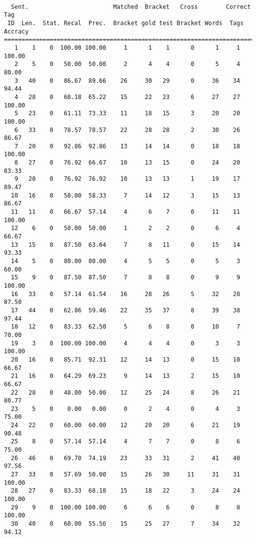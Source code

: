 \begin{verbatim}

  Sent.                        Matched  Bracket   Cross        Correct Tag
 ID  Len.  Stat. Recal  Prec.  Bracket gold test Bracket Words  Tags Accracy
============================================================================
   1    1    0  100.00 100.00     1      1    1      0      1     1   100.00
   2    5    0   50.00  50.00     2      4    4      0      5     4    80.00
   3   40    0   86.67  89.66    26     30   29      0     36    34    94.44
   4   28    0   68.18  65.22    15     22   23      6     27    27   100.00
   5   23    0   61.11  73.33    11     18   15      3     20    20   100.00
   6   33    0   78.57  78.57    22     28   28      2     30    26    86.67
   7   20    0   92.86  92.86    13     14   14      0     18    18   100.00
   8   27    0   76.92  66.67    10     13   15      0     24    20    83.33
   9   20    0   76.92  76.92    10     13   13      1     19    17    89.47
  10   16    0   50.00  58.33     7     14   12      3     15    13    86.67
  11   11    0   66.67  57.14     4      6    7      0     11    11   100.00
  12    6    0   50.00  50.00     1      2    2      0      6     4    66.67
  13   15    0   87.50  63.64     7      8   11      0     15    14    93.33
  14    5    0   80.00  80.00     4      5    5      0      5     3    60.00
  15    9    0   87.50  87.50     7      8    8      0      9     9   100.00
  16   33    0   57.14  61.54    16     28   26      5     32    28    87.50
  17   44    0   62.86  59.46    22     35   37      8     39    38    97.44
  18   12    0   83.33  62.50     5      6    8      0     10     7    70.00
  19    3    0  100.00 100.00     4      4    4      0      3     3   100.00
  20   16    0   85.71  92.31    12     14   13      0     15    10    66.67
  21   16    0   64.29  69.23     9     14   13      2     15    10    66.67
  22   28    0   48.00  50.00    12     25   24      8     26    21    80.77
  23    5    0    0.00   0.00     0      2    4      0      4     3    75.00
  24   22    0   60.00  60.00    12     20   20      6     21    19    90.48
  25    8    0   57.14  57.14     4      7    7      0      8     6    75.00
  26   46    0   69.70  74.19    23     33   31      2     41    40    97.56
  27   33    0   57.69  50.00    15     26   30     11     31    31   100.00
  28   27    0   83.33  68.18    15     18   22      3     24    24   100.00
  29    9    0  100.00 100.00     6      6    6      0      8     8   100.00
  30   40    0   60.00  55.56    15     25   27      7     34    32    94.12

\end{verbatim}
